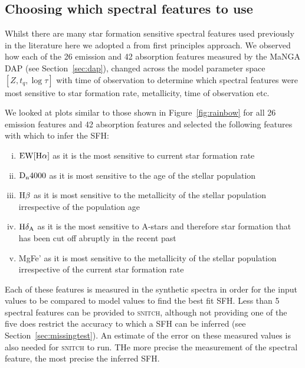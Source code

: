\documentclass[useAMS,usenatbib]{mn2e}
\begin{document}
\subsection{Choosing which spectral features to use}

Whilst there are many star formation sensitive spectral features used previously in the literature \citep{ref} here we adopted a from first principles approach. We observed how each of the 26 emission and 42 absorption features measured by the MaNGA DAP (see Section~\ref{sec:dap}), changed across the model parameter space $[Z, t_q, \log \tau]$ with time of observation to determine which spectral features were most sensitive to star formation rate, metallicity, time of observation etc. 

We looked at plots similar to those shown in Figure~\ref{fig:rainbow} for all 26 emission features and 42 absorption features and selected the following features with which to infer the SFH:
\begin{enumerate}[(i)]
\item $\rm{EW}[H\alpha]$ as it is the most sensitive to current star formation rate


\item $\rm{D}_n4000$ as it is most sensitive to the age of the stellar population

\item $\rm{H}\beta$ as it is most sensitive to the metallicity of the stellar population irrespective of the population age

\item $\rm{H}\delta_A$ as it is the most sensitive to A-stars and therefore star formation that has been cut off abruptly in the recent past

\item MgFe' as it is most sensitive to the metallicity of the stellar population irrespective of the current star formation rate
\end{enumerate}

Each of these features is measured in the synthetic spectra in order for the input values to be compared to model values to find the best fit SFH. Less than 5 spectral features can be provided to \textsc{snitch}, although not providing one of the five does restrict the accuracy to which a SFH can be inferred (see Section~\ref{sec:missingtest}). An estimate of the error on these measured values is also needed for \textsc{snitch} to run. THe more precise the measurement of the spectral feature, the most precise the inferred SFH.  
\end{document}

